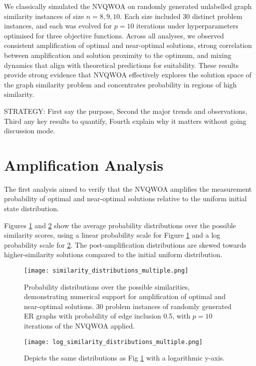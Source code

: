 We classically simulated the NVQWOA on randomly generated unlabelled graph similarity instances of size $n=8,9,10$. Each size included 30 distinct problem instances, and each was evolved for $p=10$ iterations under hyperparameters optimised for three objective functions. Across all analyses, we observed consistent amplification of optimal and near-optimal solutions, strong correlation between amplification and solution proximity to the optimum, and mixing dynamics that align with theoretical predictions for suitability. These results provide strong evidence that NVQWOA effectively explores the solution space of the graph similarity problem and concentrates probability in regions of high similarity.

STRATEGY:
First say the purpose, Second the major trends and observations, Third any key results to quantify, Fourth explain why it matters without going discussion mode.

\section{Amplification Analysis}
The first analysis aimed to verify that the NVQWOA amplifies the measurement probability of optimal and near-optimal solutions relative to the uniform initial state distribution. 

Figures \ref{fig:similarity dist} and \ref{fig:similarity log dist} show the average probability distributions over the possible similarity scores, using a linear probability scale for Figure \ref{fig:similarity dist} and a log probability scale for \ref{fig:similarity log dist}. The post-amplification distributions are skewed towards higher-similarity solutions compared to the initial uniform distribution.


\begin{figure}[htbp]
    \centering
    \texttt{[image: similarity\_distributions\_multiple.png]} 
    \caption{Probability distributions over the possible similarities, demonstrating numerical support for amplification of optimal and near-optimal solutions. 30 problem instances of randomly generated ER graphs with probability of edge inclusion 0.5, with $p=10$ iterations of the NVQWOA applied.}
    \label{fig:similarity dist}
\end{figure}

\begin{figure}[htbp]
    \centering
    \texttt{[image: log\_similarity\_distributions\_multiple.png]} 
    \caption{Depicts the same distributions as Fig \ref{fig:similarity dist} with a logarithmic y-axis.}
    \label{fig:similarity log dist}
\end{figure}

